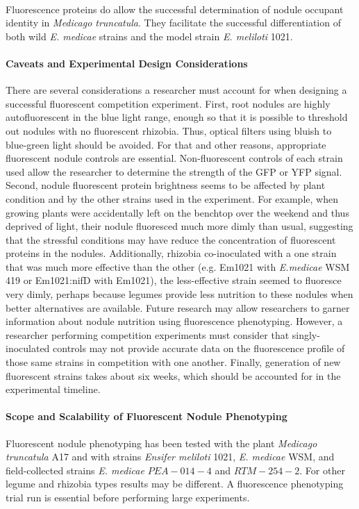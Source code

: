 \documentclass[12pt]{article}
\begin{document}
\begin{doublespace}
\begin{table}[]
\end{table}
	\paragraph{} 
Fluorescence proteins do allow the successful determination of nodule occupant identity in \textit{Medicago truncatula}. They facilitate the successful differentiation of both wild \textit{E. medicae} strains and the model strain \textit{E. meliloti} 1021. 
	\paragraph{Caveats and Experimental Design Considerations}
There are several considerations a researcher must account for when designing a successful fluorescent competition experiment. First, root nodules are highly autofluorescent in the blue light range, enough so that it is possible to threshold out nodules with no fluorescent rhizobia. Thus, optical filters using bluish to blue-green light should be avoided. For that and other reasons, appropriate fluorescent nodule controls are essential. Non-fluorescent controls of each strain used allow the researcher to determine the strength of the GFP or YFP signal. Second, nodule fluorescent protein brightness seems to be affected by plant condition and by the other strains used in the experiment. For example, when growing plants were accidentally left on the benchtop over the weekend and thus deprived of light, their nodule fluoresced much more dimly than usual, suggesting that the stressful conditions may have reduce the concentration of fluorescent proteins in the nodules. Additionally, rhizobia co-inoculated with a one strain that was much more effective than the other (e.g. Em1021 with \textit{E.medicae} WSM 419 or Em1021:nifD with Em1021), the less-effective strain seemed to fluoresce very dimly, perhaps because legumes provide less nutrition to these nodules when better alternatives are available. Future research may allow researchers to garner information about nodule nutrition using fluorescence phenotyping. However, a researcher performing competition experiments must consider that singly-inoculated controls may not provide accurate data on the fluorescence profile of those same strains in competition with one another. Finally, generation of new fluorescent strains takes about six weeks, which should be accounted for in the experimental timeline. 
	\paragraph{Scope and Scalability of Fluorescent Nodule Phenotyping}
Fluorescent nodule phenotyping has been tested with the plant \textit{Medicago truncatula} A17 and with strains \textit{Ensifer meliloti} 1021, \textit{E. medicae} WSM, and field-collected strains \textit{E. medicae} $PEA-014-4$ and $RTM-254-2$. For other legume and rhizobia types results may be different. A fluorescence phenotyping trial run is essential before performing large experiments. 

\end{doublespace}
\end{document}
